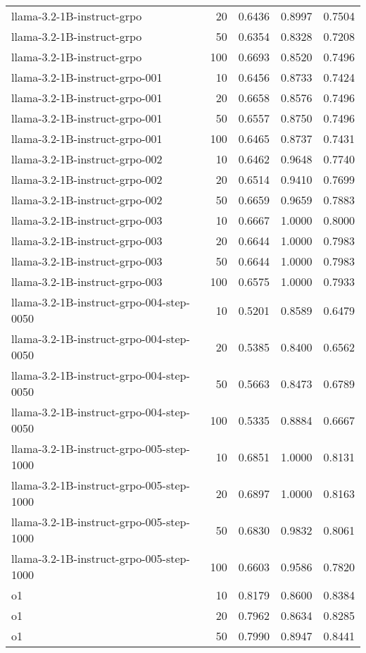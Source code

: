 \begin{tabular}{lrrrr}
llama-3.2-1B-instruct-grpo & 20 & 0.6436 & 0.8997 & 0.7504 \\
llama-3.2-1B-instruct-grpo & 50 & 0.6354 & 0.8328 & 0.7208 \\
llama-3.2-1B-instruct-grpo & 100 & 0.6693 & 0.8520 & 0.7496 \\
llama-3.2-1B-instruct-grpo-001 & 10 & 0.6456 & 0.8733 & 0.7424 \\
llama-3.2-1B-instruct-grpo-001 & 20 & 0.6658 & 0.8576 & 0.7496 \\
llama-3.2-1B-instruct-grpo-001 & 50 & 0.6557 & 0.8750 & 0.7496 \\
llama-3.2-1B-instruct-grpo-001 & 100 & 0.6465 & 0.8737 & 0.7431 \\
llama-3.2-1B-instruct-grpo-002 & 10 & 0.6462 & 0.9648 & 0.7740 \\
llama-3.2-1B-instruct-grpo-002 & 20 & 0.6514 & 0.9410 & 0.7699 \\
llama-3.2-1B-instruct-grpo-002 & 50 & 0.6659 & 0.9659 & 0.7883 \\
llama-3.2-1B-instruct-grpo-003 & 10 & 0.6667 & 1.0000 & 0.8000 \\
llama-3.2-1B-instruct-grpo-003 & 20 & 0.6644 & 1.0000 & 0.7983 \\
llama-3.2-1B-instruct-grpo-003 & 50 & 0.6644 & 1.0000 & 0.7983 \\
llama-3.2-1B-instruct-grpo-003 & 100 & 0.6575 & 1.0000 & 0.7933 \\
llama-3.2-1B-instruct-grpo-004-step-0050 & 10 & 0.5201 & 0.8589 & 0.6479 \\
llama-3.2-1B-instruct-grpo-004-step-0050 & 20 & 0.5385 & 0.8400 & 0.6562 \\
llama-3.2-1B-instruct-grpo-004-step-0050 & 50 & 0.5663 & 0.8473 & 0.6789 \\
llama-3.2-1B-instruct-grpo-004-step-0050 & 100 & 0.5335 & 0.8884 & 0.6667 \\
llama-3.2-1B-instruct-grpo-005-step-1000 & 10 & 0.6851 & 1.0000 & 0.8131 \\
llama-3.2-1B-instruct-grpo-005-step-1000 & 20 & 0.6897 & 1.0000 & 0.8163 \\
llama-3.2-1B-instruct-grpo-005-step-1000 & 50 & 0.6830 & 0.9832 & 0.8061 \\
llama-3.2-1B-instruct-grpo-005-step-1000 & 100 & 0.6603 & 0.9586 & 0.7820 \\
o1 & 10 & 0.8179 & 0.8600 & 0.8384 \\
o1 & 20 & 0.7962 & 0.8634 & 0.8285 \\
o1 & 50 & 0.7990 & 0.8947 & 0.8441 \\

\end{tabular}
